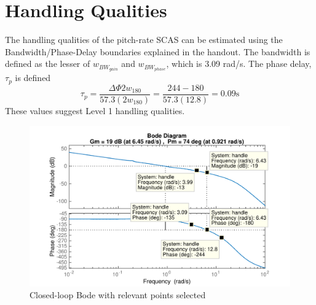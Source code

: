 \documentclass[12pt]{article}
\begin{document}
\clearpage
\section{Handling Qualities}
The handling qualities of the pitch-rate SCAS can be estimated using the Bandwidth/Phase-Delay boundaries explained in the handout. The bandwidth is defined as the lesser of $w_{BW_{gain}}$ and $w_{BW_{phase}}$, which is 3.09 rad/s. The phase delay, $\tau_p$ is defined
\begin{equation*}
\tau_p = \dfrac{\Delta \Phi 2w_{180}}{57.3 (2w_{180})} = \dfrac{244-180}{57.3 (12.8)} = 0.09 \mbox{s}
\end{equation*}
These values suggest Level 1 handling qualities.
\begin{figure}[h!]
\begin{center}
\includegraphics[height=.4\textheight]{figures/handling}
\caption{Closed-loop Bode with relevant points selected}
\end{center}
\end{figure}
\end{document}
